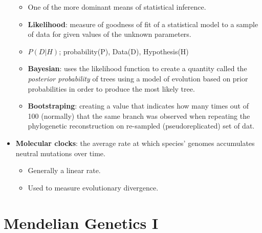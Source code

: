 \documentclass[12pt,a4paper]{article}
\begin{document}
\begin{itemize}
        \begin{itemize}
            \item One of the more dominant means of statistical inference.
            \item \textbf{Likelihood}: measure of goodness of fit of a statistical model to a sample of data for given values of the unknown parameters.
            \item {\color{o-Sun}\(P(D|H)\)}; probability(P), Data(D), Hypothesis(H)
            \item \textbf{Bayesian}: uses the likelihood function to create a quantity called the \textit{posterior probability} of trees using a model of evolution based on prior probabilities in order to produce the most likely tree.
            \item \textbf{Bootstraping}: creating a value that indicates how many times out of 100 (normally) that the same branch was observed when repeating the phylogenetic reconstruction on re-sampled (pseudoreplicated) set of dat.
        \end{itemize}
    \item \textbf{Molecular clocks}: the average rate at which species' genomes accumulates {\color{o-Sun}neutral mutations} over time.
        \begin{itemize}
            \item Generally a linear rate.
            \item Used to measure evolutionary divergence.
        \end{itemize}
\end{itemize}

\clearpage
{}
\setcounter{section}{5}
\section{Mendelian Genetics I}
\end{document}
